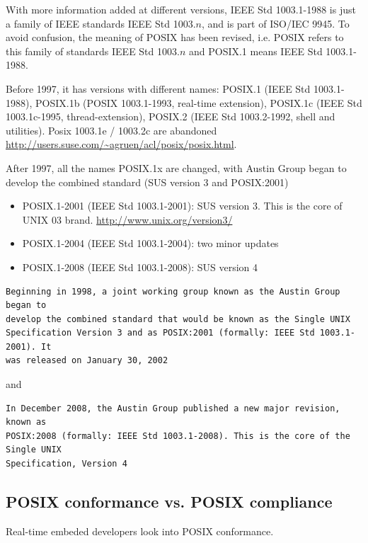 With more information added at different versions, IEEE Std 1003.1-1988 is just
a family of IEEE standards IEEE Std 1003.$n$, and is part of ISO/IEC 9945.
To avoid confusion, the meaning of POSIX has been revised, i.e. POSIX refers to
this family of standards IEEE Std 1003.$n$ and POSIX.1 means IEEE Std
1003.1-1988.

Before 1997, it has versions with different names:
POSIX.1 (IEEE Std 1003.1-1988), POSIX.1b (POSIX 1003.1-1993, real-time
extension), POSIX.1c (IEEE Std 1003.1c-1995, thread-extension), POSIX.2 (IEEE
Std 1003.2-1992, shell and utilities). Posix 1003.1e / 1003.2c  are abandoned
\url{http://users.suse.com/~agruen/acl/posix/posix.html}.



After 1997, all the names POSIX.1x are changed, with Austin Group began to
develop the combined standard (SUS version 3 and POSIX:2001)
\begin{itemize}
  \item POSIX.1-2001 (IEEE Std 1003.1-2001): SUS version 3. This is the core of
  UNIX 03 brand. \url{http://www.unix.org/version3/}
  
  \item POSIX.1-2004 (IEEE Std 1003.1-2004): two minor updates
  \item POSIX.1-2008 (IEEE Std 1003.1-2008): SUS version 4 
\end{itemize}

\begin{verbatim}
Beginning in 1998, a joint working group known as the Austin Group began to
develop the combined standard that would be known as the Single UNIX
Specification Version 3 and as POSIX:2001 (formally: IEEE Std 1003.1-2001). It
was released on January 30, 2002  
\end{verbatim}
and
\begin{verbatim}
In December 2008, the Austin Group published a new major revision, known as
POSIX:2008 (formally: IEEE Std 1003.1-2008). This is the core of the Single UNIX
Specification, Version 4 
\end{verbatim}  


\subsection{POSIX conformance vs. POSIX compliance}

Real-time embeded developers look into POSIX conformance.

